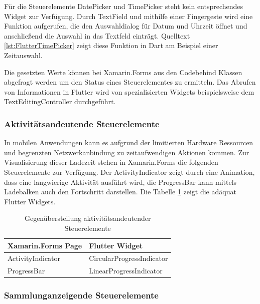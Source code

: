Für die Steuerelemente \glq DatePicker\grq{}  und \glq TimePicker\grq{} steht kein entsprechendes Widget zur Verfügung.  Durch \glq TextField\grq{} und mithilfe einer Fingergeste wird eine Funktion aufgerufen, die den Auswahldialog für Datum und Uhrzeit öffnet und anschließend die Auswahl in das Textfeld einträgt.  Quelltext \ref{lst:FlutterTimePicker} zeigt diese Funktion in Dart am Beispiel einer Zeitauswahl. 
 \newpage


Die gesetzten Werte können bei Xamarin.Forms aus den Codebehind Klassen abgefragt werden um den Status eines Steuerelementes zu ermitteln.  Das Abrufen von Informationen in Flutter wird von spezialisierten Widgets beispielsweise dem \glq TextEditingController\grq{} durchgeführt.

\subsubsection{Aktivitätsandeutende Steuerelemente}

In mobilen Anwendungen kann es aufgrund der limitierten Hardware Ressourcen und begrenzten Netzwerkanbindung zu zeitaufwendigen Aktionen kommen.  Zur Visualisierung dieser Ladezeit stehen in Xamarin.Forms die folgenden Steuerelemente zur Verfügung.  Der \glq ActivityIndicator\grq{} zeigt durch eine Animation,  dass eine langwierige Aktivität ausführt wird,  die \glq ProgressBar\grq{} kann mittels Ladebalken auch den Fortschritt darstellen.   Die Tabelle \ref{tab:ActivityControls} zeigt die adäquat Flutter Widgets.

\begin{table}[!ht]
\begin{tabularx}{\textwidth}{X|X}
   \textbf{Xamarin.Forms Page} & \textbf{Flutter Widget}  \\
\hline
	ActivityIndicator		       		&  	CircularProgressIndicator 		\\ 
	ProgressBar		       				&  	LinearProgressIndicator 		\\ 
\end{tabularx}
\caption{Gegenüberstellung aktivitätsandeutender Steuerelemente}
 \label{tab:ActivityControls}
\end{table}


\subsubsection{Sammlunganzeigende Steuerelemente}


